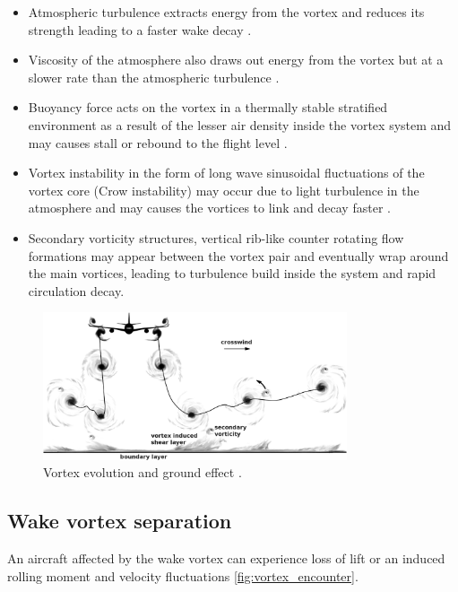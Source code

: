 \begin{itemize}
    \item Atmospheric turbulence extracts energy from the vortex and reduces its strength leading to a faster wake decay \cite{Hallock2018Apr}.
    \item Viscosity of the atmosphere also draws out energy from the vortex but at a slower rate than the atmospheric turbulence \cite{Hallock2018Apr}.
    \item Buoyancy force acts on the vortex in a thermally stable stratified environment as a result of the lesser air density inside the vortex system and may causes stall or rebound to the flight level \cite{Holzapfel2001Feb, gerz_commercial_2002}.
    \item Vortex instability in the form of long wave sinusoidal fluctuations of the vortex core (Crow instability) may occur due to light turbulence in the atmosphere and may causes the vortices to link and decay faster \cite{Hallock2018Apr, crow2003stability}.
    \item Secondary vorticity structures, vertical rib-like counter rotating flow formations may appear between the vortex pair and eventually wrap around the main vortices, leading to turbulence build inside the system and rapid circulation decay\cite{Holzapfel2001Feb, Holzapfel2003Jun}.
\end{itemize}


\begin{figure}
    \centering
    \includegraphics[width=0.8\textwidth]{graphics/Hallock_vortex_evolution.jpg}
    \caption[Wake vortex and ground effect]{Vortex evolution and ground effect \cite{Hallock2018Apr}.} \label{fig:vortex_ground_effect}
\end{figure}


\subsection{Wake vortex separation}
An aircraft affected by the wake vortex can experience loss of lift or an induced rolling moment and velocity fluctuations \ref{fig:vortex_encounter}.


